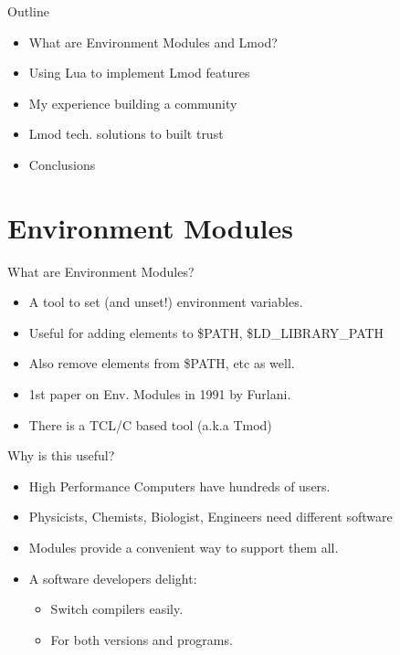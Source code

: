 \documentclass{beamer}
\begin{document}
\begin{frame}{Outline}
  \begin{itemize}
    \item What are Environment Modules and Lmod?
    \item Using Lua to implement Lmod features
    \item My experience building a community
    \item Lmod tech. solutions to built trust
    \item Conclusions
  \end{itemize}
\end{frame}



\section{Environment Modules}

\begin{frame}{What are Environment Modules?}
  \begin{itemize}
    \item A tool to set (and unset!) environment variables.
    \item Useful for adding elements to \$PATH, \$LD\_LIBRARY\_PATH
    \item Also remove elements from \$PATH, etc as well.
    \item 1st paper on Env. Modules in 1991 by Furlani.
    \item There is a TCL/C based tool (a.k.a Tmod)
  \end{itemize}
\end{frame}

\begin{frame}{Why is this useful?}
  \begin{itemize}
    \item High Performance Computers have hundreds of users.
    \item Physicists, Chemists, Biologist, Engineers need different
      software
    \item Modules provide a convenient way to support them all.
    \item A software developers delight: 
      \begin{itemize}
        \item Switch compilers easily.
        \item For both versions and programs.
      \end{itemize}
  \end{itemize}
\end{frame}
\end{document}
